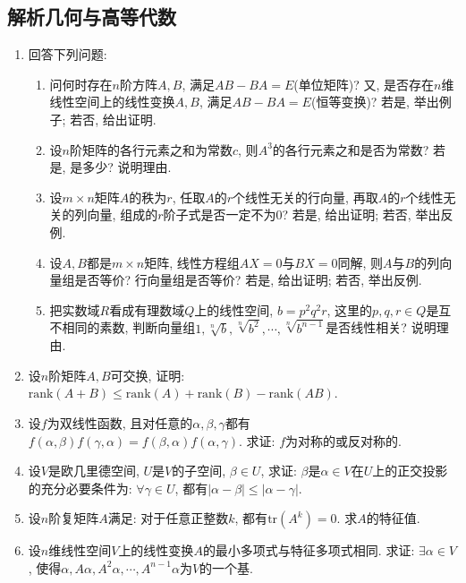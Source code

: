 \documentclass[12pt,a4paper,openany]{book}
\begin{document}
\subsection{解析几何与高等代数}
\begin{enumerate}
\item 回答下列问题:
\begin{enumerate}
\item 问何时存在$n$阶方阵$A, B$, 满足$AB - BA = E$(单位矩阵)? 又, 是否存在$n$维线性空间上的线性变换$A, B$, 满足$AB - BA = E$(恒等变换)? 若是, 举出例子; 若否, 给出证明.

\item 设$n$阶矩阵的各行元素之和为常数$c$, 则$A^3$的各行元素之和是否为常数? 若是, 是多少? 说明理由.

\item 设$m \times n$矩阵$A$的秩为$r$, 任取$A$的$r$个线性无关的行向量, 再取$A$的$r$个线性无关的列向量, 组成的$r$阶子式是否一定不为0? 若是, 给出证明; 若否, 举出反例.

\item 设$A, B$都是$m \times n$矩阵, 线性方程组$AX = 0$与$BX = 0$同解, 则$A$与$B$的列向量组是否等价? 行向量组是否等价? 若是, 给出证明; 若否, 举出反例.

\item 把实数域$R$看成有理数域$Q$上的线性空间, $b = p^2q^2r$, 这里的$p, q, r \in Q$是互不相同的素数, 判断向量组$1, \sqrt[n]{b}, \sqrt[n]{b^2}, \cdots, \sqrt[n]{b^{n-1}}$是否线性相关? 说明理由.
\end{enumerate}

\item 设$n$阶矩阵$A, B$可交换, 证明: $\text{rank}(A + B) \le \text{rank}(A) + \text{rank}(B) - \text{rank}(AB)$.

\item 设$f$为双线性函数, 且对任意的$\alpha, \beta, \gamma$都有$f(\alpha, \beta)f(\gamma, \alpha) = f(\beta, \alpha)f(\alpha, \gamma)$. 求证: $f$为对称的或反对称的.

\item 设$V$是欧几里德空间, $U$是$V$的子空间, $\beta \in U$, 求证: $\beta$是$\alpha \in V$在$U$上的正交投影的充分必要条件为: $\forall \gamma \in U$, 都有$|\alpha - \beta| \le |\alpha - \gamma|$.

\item 设$n$阶复矩阵$A$满足: 对于任意正整数$k$, 都有$\text{tr}(A^k) = 0$. 求$A$的特征值.

\item 设$n$维线性空间$V$上的线性变换$A$的最小多项式与特征多项式相同. 求证: $\exists \alpha \in V$, 使得$\alpha, A\alpha, A^2\alpha, \cdots, A^{n-1}\alpha$为$V$的一个基.


\end{enumerate}
\end{document}
